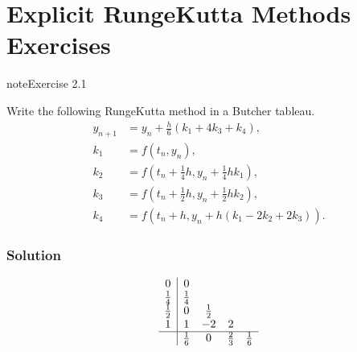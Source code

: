 \documentclass[letterpaper,10pt,english]{jupyterBook}
\begin{document}
\sphinxstepscope


\section{Explicit Runge\sphinxhyphen{}Kutta Methods Exercises}
\label{\detokenize{2_ERKs/2.5_ERK_Exercises:explicit-runge-kutta-methods-exercises}}\label{\detokenize{2_ERKs/2.5_ERK_Exercises::doc}}
\begin{sphinxadmonition}{note}{Exercise 2.1}

\sphinxAtStartPar
Write the following Runge\sphinxhyphen{}Kutta method in a Butcher tableau.
\begin{align*}
    y_{n+1} &=y_n +\frac{h}{6}(k_1 +4k_3 +k_4 ),\\
    k_1 &=f(t_n ,y_n ),\\
    k_2 &=f(t_n +\tfrac{1}{4}h,y_n +\tfrac{1}{4}hk_1 ),\\
    k_3 &=f(t_n +\tfrac{1}{2}h,y_n +\tfrac{1}{2}hk_2 ),\\
    k_4 &=f(t_n +h,y_n +h(k_1 -2k_2 +2k_3 )).
\end{align*}\subsubsection*{Solution}
\begin{align*}
    \begin{array}{c|cccc}
        0 & 0 \\
        \frac{1}{4} & \frac{1}{4} \\
        \frac{1}{2} & 0 & \frac{1}{2} \\
        1 & 1 & -2 & 2 \\ \hline
        & \frac{1}{6} & 0 & \frac{2}{3} & \frac{1}{6}
    \end{array}
\end{align*}\end{sphinxadmonition}
\end{document}
